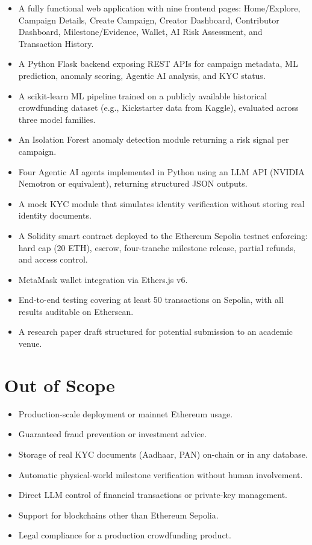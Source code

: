 \begin{itemize}
    \item A fully functional web application with nine frontend pages: Home/Explore, Campaign Details, Create Campaign, Creator Dashboard, Contributor Dashboard, Milestone/Evidence, Wallet, AI Risk Assessment, and Transaction History.
    \item A Python Flask backend exposing REST APIs for campaign metadata, ML prediction, anomaly scoring, Agentic AI analysis, and KYC status.
    \item A scikit-learn ML pipeline trained on a publicly available historical crowdfunding dataset (e.g., Kickstarter data from Kaggle), evaluated across three model families.
    \item An Isolation Forest anomaly detection module returning a risk signal per campaign.
    \item Four Agentic AI agents implemented in Python using an LLM API (NVIDIA Nemotron or equivalent), returning structured JSON outputs.
    \item A mock KYC module that simulates identity verification without storing real identity documents.
    \item A Solidity smart contract deployed to the Ethereum Sepolia testnet enforcing: hard cap (20 ETH), escrow, four-tranche milestone release, partial refunds, and access control.
    \item MetaMask wallet integration via Ethers.js v6.
    \item End-to-end testing covering at least 50 transactions on Sepolia, with all results auditable on Etherscan.
    \item A research paper draft structured for potential submission to an academic venue.
\end{itemize}

\section{Out of Scope}

\begin{itemize}
    \item Production-scale deployment or mainnet Ethereum usage.
    \item Guaranteed fraud prevention or investment advice.
    \item Storage of real KYC documents (Aadhaar, PAN) on-chain or in any database.
    \item Automatic physical-world milestone verification without human involvement.
    \item Direct LLM control of financial transactions or private-key management.
    \item Support for blockchains other than Ethereum Sepolia.
    \item Legal compliance for a production crowdfunding product.
\end{itemize}

